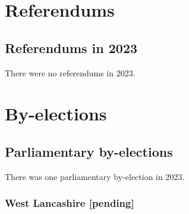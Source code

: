 \documentclass[a4paper,openany]{book}
\begin{document}



\part{Referendums}

\chapter{Referendums in 2023}

There were no referendums in 2023.




\part{By-elections}

\chapter{Parliamentary by-elections}

There was one parliamentary by-election in 2023.

%
%
%
%
%
%
%
%
%
%

\section*{West Lancashire \hspace*{\fill}\nolinebreak[1]%
	\enspace\hspace*{\fill}
	[pending]}
\end{document}
